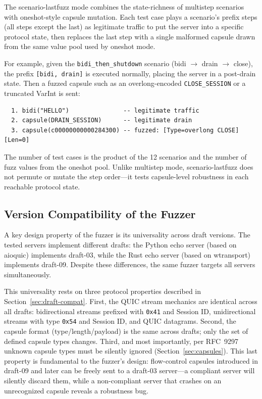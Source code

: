 The scenario-lastfuzz mode combines the state-richness of multistep scenarios with oneshot-style capsule mutation. Each test case plays a scenario's prefix steps (all steps except the last) as legitimate traffic to put the server into a specific protocol state, then replaces the last step with a single malformed capsule drawn from the same value pool used by oneshot mode.

For example, given the \texttt{bidi\_then\_shutdown} scenario (bidi $\to$ drain $\to$ close), the prefix \texttt{[bidi, drain]} is executed normally, placing the server in a post-drain state. Then a fuzzed capsule such as an overlong-encoded \texttt{CLOSE\_SESSION} or a truncated VarInt is sent:

\begin{verbatim}
  1. bidi("HELLO")               -- legitimate traffic
  2. capsule(DRAIN_SESSION)      -- legitimate drain
  3. capsule(c00000000000284300) -- fuzzed: [Type=overlong CLOSE][Len=0]
\end{verbatim}

\noindent The number of test cases is the product of the 12 scenarios and the number of fuzz values from the oneshot pool. Unlike multistep mode, scenario-lastfuzz does not permute or mutate the step order---it tests capsule-level robustness in each reachable protocol state.

\subsection{Version Compatibility of the Fuzzer}
\label{sec:version-compat}

A key design property of the fuzzer is its universality across draft versions. The tested servers implement different drafts: the Python echo server (based on aioquic) implements draft-03, while the Rust echo server (based on wtransport) implements draft-09. Despite these differences, the same fuzzer targets all servers simultaneously.

This universality rests on three protocol properties described in Section~\ref{sec:draft-compat}. First, the QUIC stream mechanics are identical across all drafts: bidirectional streams prefixed with \texttt{0x41} and Session ID, unidirectional streams with type \texttt{0x54} and Session ID, and QUIC datagrams. Second, the capsule format (type/length/payload) is the same across drafts; only the set of defined capsule types changes. Third, and most importantly, per RFC~9297 unknown capsule types must be silently ignored (Section~\ref{sec:capsules}). This last property is fundamental to the fuzzer's design: flow-control capsules introduced in draft-09 and later can be freely sent to a draft-03 server---a compliant server will silently discard them, while a non-compliant server that crashes on an unrecognized capsule reveals a robustness bug.

